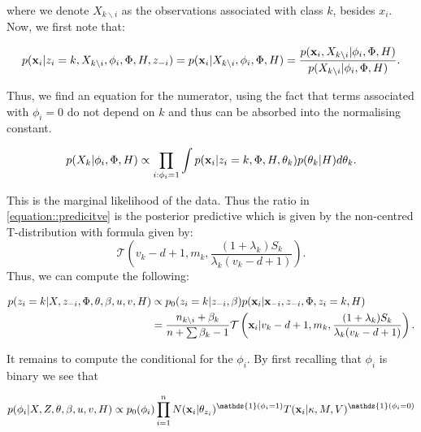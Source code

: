 \documentclass[12pt,english]{article}\usepackage[]{graphicx}\usepackage[]{color}
\begin{document}
where we denote $X_{k\backslash i}$ as the observations associated
with class $k$, besides $x_i$. Now, we first note that:

\begin{equation}\label{equation::predicitve}
\begin{split}
p({\bf x}_i| z_i = k, X_{k\backslash i}, \phi_i, \Phi, H, z_{-i}) =  p({\bf x}_i|X_{k\backslash i}, \phi_i, \Phi, H) = \frac{p({\bf x}_i, X_{k\backslash i}|\phi_i, \Phi, H)}{p(X_{k\backslash i}|\phi_i, \Phi, H)}.
\end{split}
\end{equation}

Thus, we find an equation for the numerator, using the fact that terms
associated with $\phi_i = 0$ do not depend on $k$ and thus can be
absorbed into the normalising constant.

\begin{equation}
\begin{split}
p(X_{k}|\phi_i, \Phi, H) &\propto \prod_{i:\phi_i =1}\int p({\bf x}_i| z_i = k, \Phi, H, \theta_{k})p(\theta_{k}|H) d\theta_{k}.\\
\end{split}
\end{equation}

This is the marginal likelihood of the data. Thus the ratio in \ref{equation::predicitve} is the posterior predictive which is given by the non-centred T-distribution with formula given by:
\[\mathcal{T}\left(v_k - d + 1, m_k, \frac{(1+\lambda_k)S_k}{\lambda_k
      (v_k - d + 1)} \right).\]
Thus, we can compute the following:

\begin{equation} \label{equation::alloc2}
\begin{split}
p(z_i = k|X,z_{-i},\Phi, \theta, \beta, u,v, H) & \propto p_0(z_i = k|z_{-i},\beta)p({\bf x}_i|{\bf x}_{-i},z_{-i},\Phi, z_i = k, H)\\
& = \frac{n_{k \backslash i} + \beta_k}{n + \sum \beta_k - 1}\mathcal{T}\left({\bf x}_i|v_k - d + 1, m_k,  \frac{(1+\lambda_k)S_k}{\lambda_k (v_k - d + 1)} \right) .
\end{split}
\end{equation}

It remains to compute the conditional for the $\phi_i$. By first
recalling that $\phi_i$ is binary we see that

\begin{equation}
p(\phi_i|X,Z,\theta, \beta, u,v, H) \propto p_0(\phi_i)\prod_{i = 1}^{n}N({\bf x}_i|\theta_{z_i})^{\mathds{1}(\phi_i=1)}T({\bf x}_i|\kappa, M, V)^{\mathds{1}(\phi_i=0)}
\end{equation}
\end{document}
